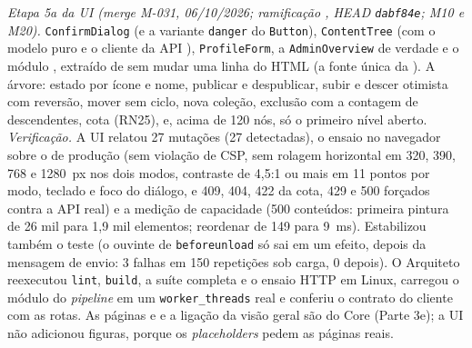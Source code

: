 \emph{Etapa 5a da UI (merge M-031, 06/10/2026; ramificação , HEAD \texttt{dabf84e}; M10 e M20).} \texttt{ConfirmDialog} (e a variante \texttt{danger} do \texttt{Button}), \texttt{ContentTree} (com o modelo puro  e o cliente da API ), \texttt{ProfileForm}, a \texttt{AdminOverview} de verdade e o módulo , extraído de  sem mudar uma linha do HTML (a fonte única da ). A árvore: estado por ícone e nome, publicar e despublicar, subir e descer otimista com reversão, mover sem ciclo, nova coleção, exclusão com a contagem de descendentes, cota (RN25), e, acima de 120 nós, só o primeiro nível aberto. \emph{Verificação.} A UI relatou 27 mutações (27 detectadas), o ensaio no navegador sobre o  de produção (sem violação de CSP, sem rolagem horizontal em 320, 390, 768 e 1280~px nos dois modos, contraste de 4,5:1 ou mais em 11 pontos por modo, teclado e foco do diálogo, e 409, 404, 422 da cota, 429 e 500 forçados contra a API real) e a medição de capacidade (500 conteúdos: primeira pintura de 26 mil para 1,9 mil elementos; reordenar de 149 para 9~ms). Estabilizou também o teste  (o ouvinte de \texttt{beforeunload} só sai em um efeito, depois da mensagem de envio: 3 falhas em 150 repetições sob carga, 0 depois). O Arquiteto reexecutou \texttt{lint}, \texttt{build}, a suíte completa e o ensaio HTTP em Linux, carregou o módulo do \emph{pipeline} em um \texttt{worker\_threads} real e conferiu o contrato do cliente com as rotas. As páginas  e  e a ligação da visão geral são do Core (Parte 3e); a UI não adicionou figuras, porque os \emph{placeholders} pedem as páginas reais.

